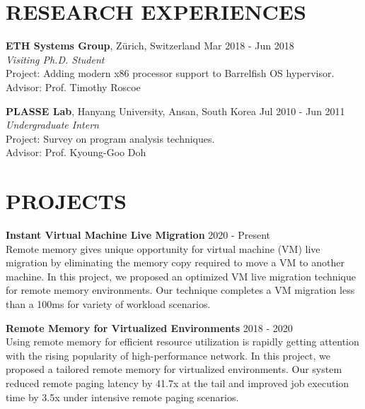 \documentclass[margin]{res}
\begin{document}
\begin{resume}
\vspace{-1.5em}
\section{RESEARCH EXPERIENCES}
\par
\textbf{ETH Systems Group}, Z{\"u}rich, Switzerland \hfill Mar 2018 - Jun 2018 \\
\textit{Visiting Ph.D. Student} \\
Project: Adding modern x86 processor support to Barrelfish OS hypervisor. \\
Advisor: Prof. Timothy Roscoe \\

\vspace{-1.5em}
\par
\textbf{PLASSE Lab}, Hanyang University, Ansan, South Korea \hfill Jul 2010 - Jun 2011 \\
\textit{Undergraduate Intern} \\
Project: Survey on program analysis techniques. \\
Advisor: Prof. Kyoung-Goo Doh \\


\vspace{-1.5em}
\section{PROJECTS}
\par
\textbf{Instant Virtual Machine Live Migration} \hfill 2020 - Present \\
Remote memory gives unique opportunity for virtual machine (VM)
live migration by eliminating the memory copy required to move a VM
to another machine. In this project, we proposed an optimized VM live migration
technique for remote memory environments.
Our technique completes a VM migration less than a 100ms for variety of
workload scenarios.

\vspace{-0.5em}
\par
\textbf{Remote Memory for Virtualized Environments} \hfill 2018 - 2020 \\
Using remote memory for efficient resource utilization is rapidly getting
attention with the rising popularity of high-performance network.
In this project, we proposed a tailored remote memory for virtualized
environments. Our system reduced remote paging latency by 41.7x at the tail
and improved job execution time by 3.5x under intensive remote paging scenarios.


\end{resume}
\end{document}
